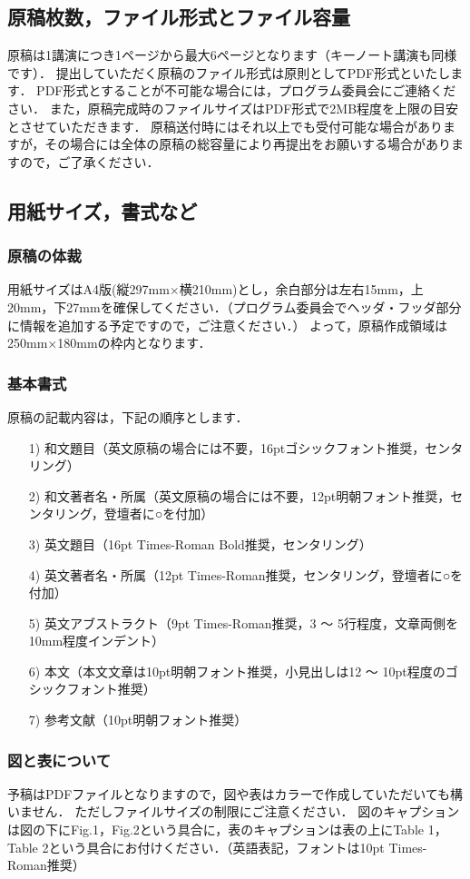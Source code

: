\documentclass[a4j,fleqn,dvipdfmx,uplatex]{jsarticle}
\begin{document}
\subsection{原稿枚数，ファイル形式とファイル容量}
原稿は1講演につき1ページから最大6ページとなります（キーノート講演も同様です）．
提出していただく原稿のファイル形式は原則としてPDF形式といたします．
PDF形式とすることが不可能な場合には，プログラム委員会にご連絡ください．
また，原稿完成時のファイルサイズはPDF形式で2MB程度を上限の目安とさせていただきます．
原稿送付時にはそれ以上でも受付可能な場合がありますが，その場合には全体の原稿の総容量により再提出をお願いする場合がありますので，ご了承ください．
%
\subsection{用紙サイズ，書式など}
\subsubsection{原稿の体裁}
用紙サイズはA4版(縦297mm$\times$横210mm)とし，余白部分は左右15mm，上20mm，下27mmを確保してください．（プログラム委員会でヘッダ・フッダ部分に情報を追加する予定ですので，ご注意ください．）
よって，原稿作成領域は250mm$\times$180mmの枠内となります．
%
\subsubsection{基本書式}
原稿の記載内容は，下記の順序とします．
\begin{enumerate}
\setlength{\parskip}{0cm} %
\setlength{\itemsep}{0cm} %
\item[1)] 和文題目（英文原稿の場合には不要，16ptゴシックフォント推奨，センタリング）
\item[2)] 和文著者名・所属（英文原稿の場合には不要，12pt明朝フォント推奨，センタリング，登壇者に○を付加）
\item[3)] 英文題目（16pt Times-Roman Bold推奨，センタリング）
\item[4)] 英文著者名・所属（12pt Times-Roman推奨，センタリング，登壇者に○を付加）
\item[5)] 英文アブストラクト（9pt Times-Roman推奨，3 〜 5行程度，文章両側を10mm程度インデント）
\item[6)] 本文（本文文章は10pt明朝フォント推奨，小見出しは12 〜 10pt程度のゴシックフォント推奨）
\item[7)] 参考文献（10pt明朝フォント推奨）
\end{enumerate}
\subsubsection{図と表について}
予稿はPDFファイルとなりますので，図や表はカラーで作成していただいても構いません．
ただしファイルサイズの制限にご注意ください．
図のキャプションは図の下にFig.1，Fig.2という具合に，表のキャプションは表の上にTable 1，Table 2という具合にお付けください．（英語表記，フォントは10pt Times-Roman推奨）
%
\end{document}
